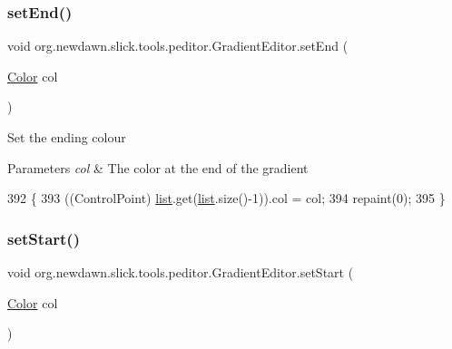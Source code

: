 \subsubsection{\texorpdfstring{set\+End()}{setEnd()}}
{\footnotesize\ttfamily void org.\+newdawn.\+slick.\+tools.\+peditor.\+Gradient\+Editor.\+set\+End (\begin{DoxyParamCaption}\item[{\mbox{\hyperlink{classorg_1_1newdawn_1_1slick_1_1_color}{Color}}}]{col }\end{DoxyParamCaption})\hspace{0.3cm}{\ttfamily [inline]}}

Set the ending colour


\begin{DoxyParams}{Parameters}
{\em col} & The color at the end of the gradient \\
\hline
\end{DoxyParams}

\begin{DoxyCode}
392                                   \{
393         ((ControlPoint) \mbox{\hyperlink{classorg_1_1newdawn_1_1slick_1_1tools_1_1peditor_1_1_gradient_editor_aa53704ef8438035eb76c8c6aab8af133}{list}}.get(\mbox{\hyperlink{classorg_1_1newdawn_1_1slick_1_1tools_1_1peditor_1_1_gradient_editor_aa53704ef8438035eb76c8c6aab8af133}{list}}.size()-1)).col = col;
394         repaint(0);
395     \}
\end{DoxyCode}
\mbox{\label{classorg_1_1newdawn_1_1slick_1_1tools_1_1peditor_1_1_gradient_editor_a279e633c22815808d42458246a345762}} 
\subsubsection{\texorpdfstring{set\+Start()}{setStart()}}
{\footnotesize\ttfamily void org.\+newdawn.\+slick.\+tools.\+peditor.\+Gradient\+Editor.\+set\+Start (\begin{DoxyParamCaption}\item[{\mbox{\hyperlink{classorg_1_1newdawn_1_1slick_1_1_color}{Color}}}]{col }\end{DoxyParamCaption})\hspace{0.3cm}{\ttfamily [inline]}}

